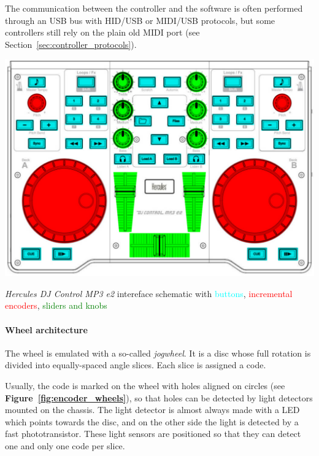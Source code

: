 \documentclass[a4paper,10pt]{article}
\makeatletter
\newenvironment{figurehere}{\def\@captype{figure}\vspace{2ex}}{\vspace{2ex}}
\newcommand{\citef}[1]{\textbf{Figure~\ref{#1}}}
\makeatother
\begin{document}
\begin{multicols}{2}
The communication between the controller and the software is often performed
through an USB bus with HID/USB or MIDI/USB protocols, but some controllers
still rely on the plain old MIDI port (see Section~\ref{sec:controller_protocols}).

\begin{figurehere}
	\centering
	\includegraphics[keepaspectratio=true,width=\columnwidth]{images/hercules_mp3e2_schematic.pdf}
	\caption{\emph{Hercules DJ Control MP3 e2} \cite{hercules_djcmp3e2}
	intereface schematic with \textcolor{cyan}{buttons}, \textcolor{red}{incremental encoders},
	\textcolor{green}{sliders and knobs}}
	\label{fig:hercules_mp3e2_schematic}
\end{figurehere}


\paragraph{Wheel architecture}
The wheel is emulated with a so-called \emph{jogwheel}. It is a disc whose
full rotation is divided into equally-spaced angle slices. Each slice is
assigned a code.

Usually, the code is marked on the wheel with holes aligned on circles (see
\citef{fig:encoder_wheels}), so that holes can be detected by light detectors
mounted on the chassis. The light detector is almost always made with a LED
which points towards the disc, and on the other side the light is detected by
a fast phototransistor. These light sensors are positioned so that they can
detect one and only one code per slice.


\end{multicols}
\end{document}
